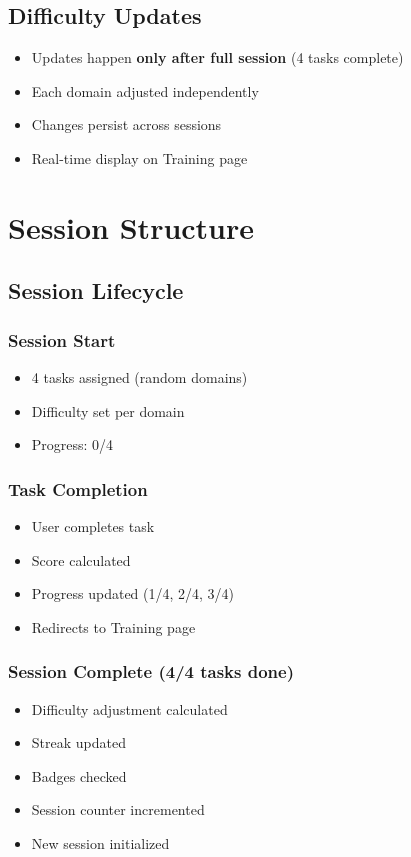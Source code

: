 \documentclass[12pt,a4paper]{article}
\begin{document}
\subsection{Difficulty Updates}

\begin{itemize}
    \item Updates happen \textbf{only after full session} (4 tasks complete)
    \item Each domain adjusted independently
    \item Changes persist across sessions
    \item Real-time display on Training page
\end{itemize}

\section{Session Structure}

\subsection{Session Lifecycle}

\subsubsection{Session Start}
\begin{itemize}
    \item 4 tasks assigned (random domains)
    \item Difficulty set per domain
    \item Progress: 0/4
\end{itemize}

\subsubsection{Task Completion}
\begin{itemize}
    \item User completes task
    \item Score calculated
    \item Progress updated (1/4, 2/4, 3/4)
    \item Redirects to Training page
\end{itemize}

\subsubsection{Session Complete (4/4 tasks done)}
\begin{itemize}
    \item Difficulty adjustment calculated
    \item Streak updated
    \item Badges checked
    \item Session counter incremented
    \item New session initialized
\end{itemize}
\end{document}
